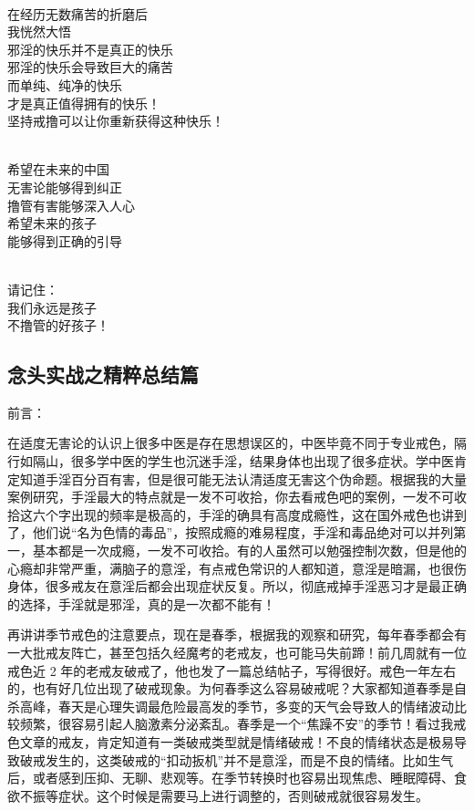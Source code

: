 \documentclass{ctexart}
\begin{document}
\begin{center}
\begin{multicols}{2}
        ~\\

        在经历无数痛苦的折磨后 \\ 我恍然大悟 \\ 邪淫的快乐并不是真正的快乐 \\ 邪淫的快乐会导致巨大的痛苦 \\ 而单纯、纯净的快乐 \\ 才是真正值得拥有的快乐！ \\ 坚持戒撸可以让你重新获得这种快乐！

        ~\\

        希望在未来的中国 \\ 无害论能够得到纠正 \\ 撸管有害能够深入人心 \\ 希望未来的孩子 \\ 能够得到正确的引导

        ~\\

        请记住： \\ 我们永远是孩子 \\ 不撸管的好孩子！
    \end{multicols}
\end{center}

\subsection{念头实战之精粹总结篇}

前言：

在适度无害论的认识上很多中医是存在思想误区的，中医毕竟不同于专业戒色，隔行如隔山，很多学中医的学生也沉迷手淫，结果身体也出现了很多症状。学中医肯定知道手淫百分百有害，但是很可能无法认清适度无害这个伪命题。根据我的大量案例研究，手淫最大的特点就是一发不可收拾，你去看戒色吧的案例，一发不可收拾这六个字出现的频率是极高的，手淫的确具有高度成瘾性，这在国外戒色也讲到了，他们说“名为色情的毒品”，按照成瘾的难易程度，手淫和毒品绝对可以并列第一，基本都是一次成瘾，一发不可收拾。有的人虽然可以勉强控制次数，但是他的心瘾却非常严重，满脑子的意淫，有点戒色常识的人都知道，意淫是暗漏，也很伤身体，很多戒友在意淫后都会出现症状反复。所以，彻底戒掉手淫恶习才是最正确的选择，手淫就是邪淫，真的是一次都不能有！

再讲讲季节戒色的注意要点，现在是春季，根据我的观察和研究，每年春季都会有一大批戒友阵亡，甚至包括久经魔考的老戒友，也可能马失前蹄！前几周就有一位戒色近 2 年的老戒友破戒了，他也发了一篇总结帖子，写得很好。戒色一年左右的，也有好几位出现了破戒现象。为何春季这么容易破戒呢？大家都知道春季是自杀高峰，春天是心理失调最危险最高发的季节，多变的天气会导致人的情绪波动比较频繁，很容易引起人脑激素分泌紊乱。春季是一个“焦躁不安”的季节！看过我戒色文章的戒友，肯定知道有一类破戒类型就是情绪破戒！不良的情绪状态是极易导致破戒发生的，这类破戒的“扣动扳机”并不是意淫，而是不良的情绪。比如生气后，或者感到压抑、无聊、悲观等。在季节转换时也容易出现焦虑、睡眠障碍、食欲不振等症状。这个时候是需要马上进行调整的，否则破戒就很容易发生。
\end{document}
